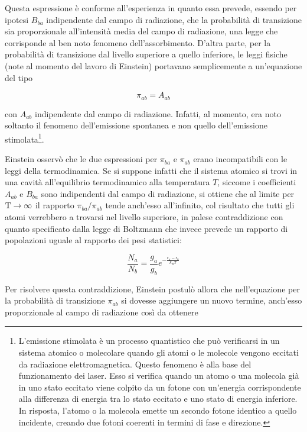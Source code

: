 Questa espressione è conforme all'esperienza in quanto essa prevede, essendo per ipotesi $B_{ba}$ indipendente dal campo di radiazione, che la probabilità di transizione sia proporzionale all'intensità media del campo di radiazione, una legge che corrisponde al ben noto fenomeno dell'assorbimento. D'altra parte,
per la probabilità di transizione dal livello superiore a quello inferiore, le leggi fisiche (note al momento del lavoro di Einstein) portavano semplicemente a un'equazione del tipo

\begin{equation*}
  \pi_{ab}=A_{ab}
\end{equation*}

con $A_{ab}$ indipendente dal campo di radiazione. Infatti, al momento, era noto soltanto il fenomeno dell'emissione spontanea e non quello dell'emissione stimolata\footnote{L'emissione stimolata è un processo quantistico che può verificarsi in un sistema atomico o molecolare quando gli atomi o le molecole vengono eccitati da radiazione elettromagnetica. Questo fenomeno è alla base del funzionamento dei laser. Esso si verifica quando un atomo o una molecola già in uno stato eccitato viene colpito da un fotone con un'energia corrispondente alla differenza di energia tra lo stato eccitato e uno stato di energia inferiore. In risposta, l'atomo o la molecola emette un secondo fotone identico a quello incidente, creando due fotoni coerenti in termini di fase e direzione.}.

Einstein osservò che le due espressioni per $\pi_{ba}$ e $\pi_{ab}$ erano incompatibili con le leggi della termodinamica. Se si suppone infatti che il sistema atomico si trovi in una cavità all'equilibrio termodinamico alla temperatura $T$, siccome i coefficienti $A_{ab}$ e $B_{ba}$ sono indipendenti dal campo di radiazione, si ottiene che al limite per $\rm T \to \infty$ il rapporto $\pi_{ba}/\pi_{ab}$ tende anch'esso all'infinito, col risultato che tutti gli atomi verrebbero a trovarsi nel livello superiore, in palese contraddizione con quanto specificato dalla legge di Boltzmann che invece prevede un rapporto di popolazioni uguale al rapporto dei pesi statistici:

\begin{equation*}
  \frac{N_a}{N_b}=\frac{g_a}{g_b} e^{-\frac{\epsilon_a - \epsilon_b}{k_B T}}
\end{equation*}

Per risolvere questa contraddizione, Einstein postulò allora che nell'equazione per la probabilità di transizione $\pi_{ab}$ si dovesse aggiungere un nuovo termine, anch'esso proporzionale al campo di radiazione così da ottenere

